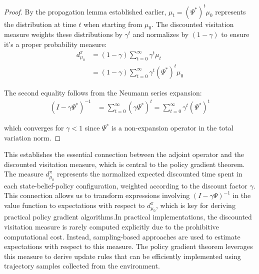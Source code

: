 \documentclass[a4paper,12pt]{report}
\begin{document}
\begin{proof}
    By the propagation lemma established earlier,
    $\mu_{t} = (\Psi^{*})^{t}\mu_{0}$ represents the distribution at time $t$ when
    starting from $\mu_{0}$. The discounted visitation measure weights these distributions
    by $\gamma^{t}$ and normalizes by $(1-\gamma)$ to ensure it's a proper probability
    measure:
    \begin{align}
        d^{\pi}_{\mu_0} & = (1-\gamma) \sum_{t=0}^{\infty}\gamma^{t} \mu_{t}                \\
                        & = (1-\gamma) \sum_{t=0}^{\infty}\gamma^{t} (\Psi^{*})^{t} \mu_{0}
    \end{align}

    The second equality follows from the Neumann series expansion:
    \begin{align}
        (I - \gamma\Psi^{*})^{-1} & = \sum_{t=0}^{\infty}(\gamma\Psi^{*})^{t} = \sum_{t=0}^{\infty}\gamma^{t} (\Psi^{*})^{t}
    \end{align}

    which converges for $\gamma < 1$ since $\Psi^{*}$ is a non-expansion operator in
    the total variation norm.
\end{proof}This establishes the essential connection between the adjoint operator
and the discounted visitation measure, which is central to the policy gradient
theorem. The measure $d^{\pi}_{\mu_0}$ represents the normalized expected discounted
time spent in each state-belief-policy configuration, weighted according to the
discount factor $\gamma$. This connection allows us to transform expressions involving
$(I - \gamma\Psi)^{-1}$ in the value function to expectations with respect to $d^{\pi}
        _{\mu_0}$, which is key for deriving practical policy gradient algorithms.In
practical implementations, the discounted visitation measure is rarely computed explicitly
due to the prohibitive computational cost. Instead, sampling-based approaches are
used to estimate expectations with respect to this measure. The policy gradient
theorem leverages this measure to derive update rules that can be efficiently
implemented using trajectory samples collected from the environment.
\end{document}
